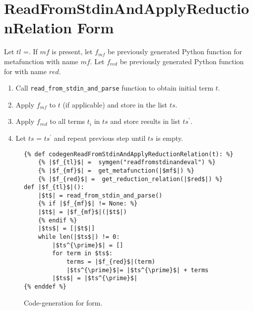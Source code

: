 \section{ReadFromStdinAndApplyReductionRelation Form}

Let $tl$ =\ReadFromStdinAndApplyReductionRelation. If $mf$ is present, let $f_{mf}$ be previously generated Python function for metafunction with name $mf$. Let $f_{red}$ be previously generated Python function for \RedexMatchAssertEqualNoArgs \space with name $red$. 

\begin{enumerate}
\item Call \texttt{read\_from\_stdin\_and\_parse} function to obtain initial term $t$.
\item Apply $f_{mf}$ to $t$ (if applicable) and store in the list $ts$.
\item Apply $f_{red}$ to all terms $t_i$ in $ts$ and store results in list $ts^{\prime}$.
\item Let $ts$ = $ts^{\prime}$ and repeat previous step until $ts$ is empty.
\end{enumerate}

\begin{figure}
\begin{verbatim}
{% def codegenReadFromStdinAndApplyReductionRelation(t): %}
	{% |$f_{tl}$| =  symgen("readfromstdinandeval") %}
	{% |$f_{mf}$| =  get_metafunction(|$mf$|) %}
	{% |$f_{red}$| =  get_reduction_relation(|$red$|) %}
def |$f_{tl}$|():
	|$t$| = read_from_stdin_and_parse()
	{% if |$f_{mf}$| != None: %}
	|$t$| = |$f_{mf}$|(|$t$|)
	{% endif %}
    |$ts$| = [|$t$|]
    while len(|$ts$|) != 0:
        |$ts^{\prime}$| = []
        for term in $ts$:
            terms = |$f_{red}$|(term)
            |$ts^{\prime}$|= |$ts^{\prime}$| + terms 
        |$ts$| = |$ts^{\prime}$|
{% enddef %}
\end{verbatim}
\caption{Code-generation for \ReadFromStdinAndApplyReductionRelationNoArgs form.}
\label{codegen-repl}
\end{figure}
